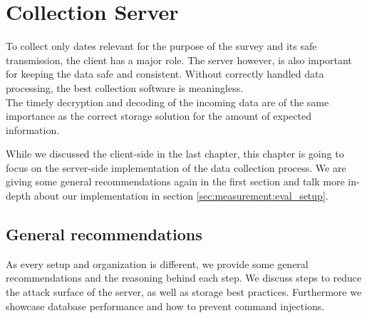 \chapter{Collection Server}
\label{chap:mmeasurement}
To collect only dates relevant for the purpose of the survey and its safe transmission, the client has a major role. The server however, is also important for keeping the data safe and consistent. Without correctly handled data processing, the best collection software is meaningless.\\
The timely decryption and decoding of the incoming data are of the same importance as the correct storage solution for the amount of expected information.

While we discussed the client-side in the last chapter, this chapter is going to focus on
the server-side implementation of the data collection process. 
We are giving some general recommendations again in the first section and talk more in-depth about our implementation in section \ref{sec:measurement:eval_setup}.
%


\section{General recommendations}
    \label{sec:measurement:limits}
%
    As every setup and organization is different, we provide some general recommendations and the reasoning behind each step. We discuss steps to reduce the attack surface of the server, as well as storage best practices. Furthermore we showcase database performance and how to prevent command injections.
    

